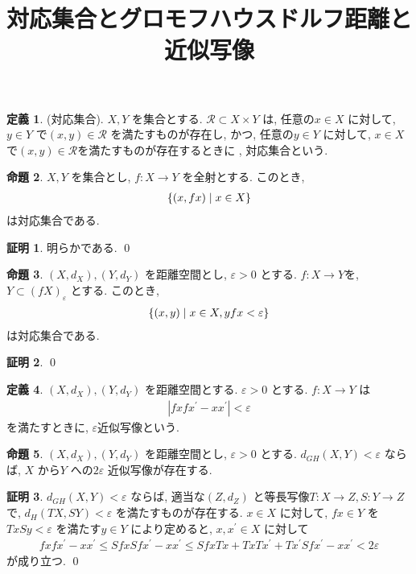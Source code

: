 \documentclass[10pt, fleqn, label-section=none]{bxjsarticle}
\title{対応集合とグロモフハウスドルフ距離と近似写像}
\date{}
\author{}
\theoremstyle{definition}
\newtheorem{dfn}{定義}[section]
\newtheorem{prop}[dfn]{命題}
\newtheorem*{pf*}{証明}
\newcommand{\veps}{\varepsilon}
\newcommand{\cbra}[1]{\mleft\{#1\mright\}}
\newcommand{\abs}[1]{\left|#1\right|}
\renewcommand{\;}{\, ; \,}
\begin{document}
\maketitle

\section{}

\begin{dfn}(対応集合). $X, Y$ を集合とする. $\mathcal R \subset X \times Y$ は, 任意の$x \in X$ に対して, $y \in Y$ で$(x, y ) \in \mathcal R$ を満たすものが存在し, かつ, 任意の$y \in Y$ に対して, $x \in X$ で$(x, y ) \in \mathcal R$を満たすものが存在するときに , 対応集合という. 

\end{dfn}

\begin{prop}$X, Y$ を集合とし, $f: X \rightarrow Y$ を全射とする. このとき, 
\begin{align*} \cbra{(x, fx) \mid x \in X}\end{align*}
は対応集合である. 
\end{prop}
\begin{pf*}
明らかである. 
\qed
\end{pf*}

\begin{prop}$(X, d_X), (Y, d_Y)$ を距離空間とし, $\veps >0 $ とする. $f: X \rightarrow Y $を, $Y \subset (fX)_\veps $ とする. このとき, 
\begin{align*} \cbra{(x, y) \mid x \in X ,  yfx < \veps} \end{align*}
は対応集合である. 
\end{prop}
\begin{pf*}

\qed
\end{pf*}

\begin{dfn}$(X, d_X) , (Y, d_Y)$ を距離空間とする. $\veps >0$ とする. $f: X \rightarrow Y$ は
\begin{align*} \abs{fxfx^\prime - xx^\prime } < \veps \end{align*}
を満たすときに, $\veps$近似写像という. 
\end{dfn}

\begin{prop}$(X, d_X), (Y, d_Y)$ を距離空間とし, $\veps > 0$ とする. $d_{GH}(X, Y) < \veps$ ならば, $X$ から$Y$ への$2 \veps$ 近似写像が存在する. 

\end{prop}
\begin{pf*}$d_{GH}(X, Y) < \veps$ ならば, 適当な$(Z, d_Z)$ と等長写像$T: X \rightarrow Z, S: Y \rightarrow Z$で, $d_H (TX, SY) < \veps$ を満たすものが存在する. $x \in X$ に対して, $fx \in Y$ を$TxSy < \veps$ を満たす$y \in Y$ により定めると, $x, x^\prime \in X$ に対して
\begin{align*} fx fx^\prime - x  x^\prime \leq Sfx Sfx^\prime - xx^\prime \leq Sfx Tx + Tx Tx^\prime + Tx^\prime Sf x^\prime - x x^\prime < 2 \veps \end{align*} 
が成り立つ. 
\qed
\end{pf*}
\end{document}
